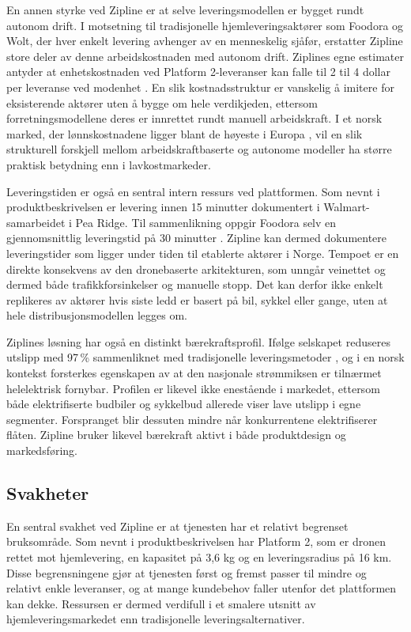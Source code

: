 En annen styrke ved Zipline er at selve leveringsmodellen er bygget
rundt autonom drift. I motsetning til tradisjonelle hjemleveringsaktører
som Foodora og Wolt, der hver enkelt levering avhenger av en menneskelig
sjåfør, erstatter Zipline store deler av denne arbeidskostnaden med autonom
drift. Ziplines egne estimater antyder at enhetskostnaden ved Platform
2-leveranser kan falle til 2 til 4 dollar per leveranse ved modenhet
\parencite{logisticsnavigators2026}. En slik kostnadsstruktur er vanskelig å
imitere for eksisterende aktører uten å bygge om hele verdikjeden, ettersom
forretningsmodellene deres er innrettet rundt manuell arbeidskraft. I et
norsk marked, der lønnskostnadene ligger blant de høyeste i Europa
\parencite{ssb2024}, vil en slik strukturell forskjell mellom
arbeidskraftbaserte og autonome modeller ha større praktisk betydning enn i
lavkostmarkeder.

Leveringstiden er også en sentral intern ressurs ved plattformen. Som nevnt
i produktbeskrivelsen er levering innen 15 minutter dokumentert i
Walmart-samarbeidet i Pea Ridge. Til sammenlikning oppgir Foodora selv en
gjennomsnittlig leveringstid på 30 minutter \parencite{foodora_hahalden}.
Zipline kan dermed dokumentere leveringstider som ligger under tiden til
etablerte aktører i Norge. Tempoet er en direkte konsekvens av den
dronebaserte arkitekturen, som unngår veinettet og dermed både
trafikkforsinkelser og manuelle stopp. Det kan derfor ikke enkelt
replikeres av aktører hvis siste ledd er basert på bil, sykkel eller
gange, uten at hele distribusjonsmodellen legges om.

Ziplines løsning har også en distinkt bærekraftsprofil. Ifølge selskapet
reduseres utslipp med 97\,\% sammenliknet med tradisjonelle
leveringsmetoder \parencite{zipline_ntia2024}, og i en norsk
kontekst forsterkes
egenskapen av at den nasjonale strømmiksen er tilnærmet helelektrisk
fornybar. Profilen er likevel ikke enestående i markedet, ettersom både
elektrifiserte budbiler og sykkelbud allerede viser lave utslipp i egne
segmenter. Forspranget blir dessuten mindre når konkurrentene elektrifiserer
flåten.
Zipline bruker likevel bærekraft aktivt i både produktdesign og
markedsføring.

\subsection{Svakheter}

En sentral svakhet ved Zipline er at tjenesten har et relativt begrenset
bruksområde. Som nevnt i produktbeskrivelsen har Platform 2, som er dronen
rettet mot hjemlevering, en kapasitet på 3,6 kg og en leveringsradius på 16
km. Disse begrensningene gjør at tjenesten først og fremst passer til
mindre og relativt enkle leveranser, og at mange kundebehov faller utenfor
det plattformen kan dekke. Ressursen er dermed verdifull i et smalere
utsnitt av hjemleveringsmarkedet enn tradisjonelle leveringsalternativer.

